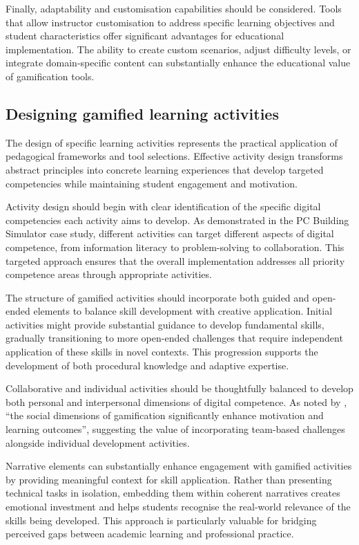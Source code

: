 \documentclass[cte]{acnsart}
\begin{document}
Finally, adaptability and customisation capabilities should be considered. Tools that allow instructor customisation to address specific learning objectives and student characteristics offer significant advantages for educational implementation. The ability to create custom scenarios, adjust difficulty levels, or integrate domain-specific content can substantially enhance the educational value of gamification tools.

\subsection{Designing gamified learning activities}

The design of specific learning activities represents the practical application of pedagogical frameworks and tool selections. Effective activity design transforms abstract principles into concrete learning experiences that develop targeted competencies while maintaining student engagement and motivation.

Activity design should begin with clear identification of the specific digital competencies each activity aims to develop. As demonstrated in the PC Building Simulator case study, different activities can target different aspects of digital competence, from information literacy to problem-solving to collaboration. This targeted approach ensures that the overall implementation addresses all priority competence areas through appropriate activities.

The structure of gamified activities should incorporate both guided and open-ended elements to balance skill development with creative application. Initial activities might provide substantial guidance to develop fundamental skills, gradually transitioning to more open-ended challenges that require independent application of these skills in novel contexts. This progression supports the development of both procedural knowledge and adaptive expertise.

Collaborative and individual activities should be thoughtfully balanced to develop both personal and interpersonal dimensions of digital competence. As noted by \citet{Humeniuk2022113}, ``the social dimensions of gamification significantly enhance motivation and learning outcomes'', suggesting the value of incorporating team-based challenges alongside individual development activities.

Narrative elements can substantially enhance engagement with gamified activities by providing meaningful context for skill application. Rather than presenting technical tasks in isolation, embedding them within coherent narratives creates emotional investment and helps students recognise the real-world relevance of the skills being developed. This approach is particularly valuable for bridging perceived gaps between academic learning and professional practice.
\end{document}
